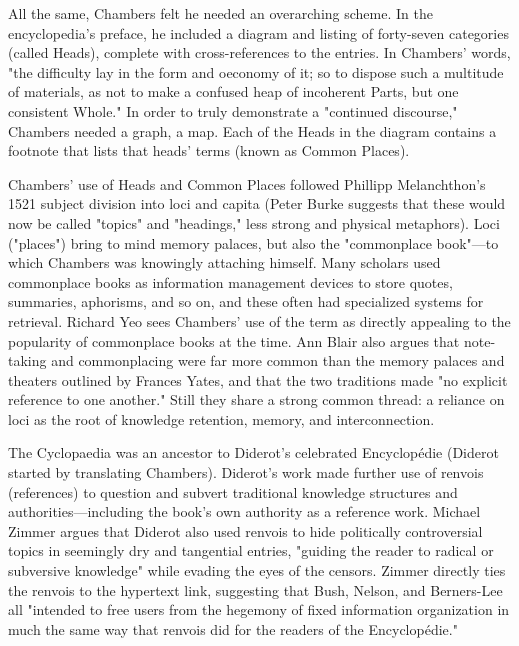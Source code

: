All the same, Chambers felt he needed an overarching scheme. In the encyclopedia's preface, he included a diagram and listing of forty-seven categories (called Heads), complete with cross-references to the entries. In Chambers' words, "the difficulty lay in the form and oeconomy of it; so to dispose such a multitude of materials, as not to make a confused heap of incoherent Parts, but one consistent Whole."  In order to truly demonstrate a "continued discourse," Chambers needed a graph, a map. Each of the Heads in the diagram contains a footnote that lists that heads' terms (known as Common Places). 

Chambers' use of Heads and Common Places followed Phillipp Melanchthon's 1521 subject division into loci and capita (Peter Burke suggests that these would now be called "topics" and "headings," less strong and physical metaphors).  Loci ("places") bring to mind memory palaces, but also the "commonplace book"—to which Chambers was knowingly attaching himself. Many scholars used commonplace books as information management devices to store quotes, summaries, aphorisms, and so on, and these often had specialized systems for retrieval. Richard Yeo sees Chambers' use of the term as directly appealing to the popularity of commonplace books at the time.  Ann Blair also argues that note-taking and commonplacing were far more common than the memory palaces and theaters outlined by Frances Yates, and that the two traditions made "no explicit reference to one another."  Still they share a strong common thread: a reliance on loci as the root of knowledge retention, memory, and interconnection.

The Cyclopaedia was an ancestor to Diderot's celebrated Encyclopédie (Diderot started by translating Chambers). Diderot's work made further use of renvois (references) to question and subvert traditional knowledge structures and authorities—including the book's own authority as a reference work. Michael Zimmer argues that Diderot also used renvois to hide politically controversial topics in seemingly dry and tangential entries, "guiding the reader to radical or subversive knowledge" while evading the eyes of the censors.  Zimmer directly ties the renvois to the hypertext link, suggesting that Bush, Nelson, and Berners-Lee all "intended to free users from the hegemony of fixed information organization in much the same way that renvois did for the readers of the Encyclopédie." 

